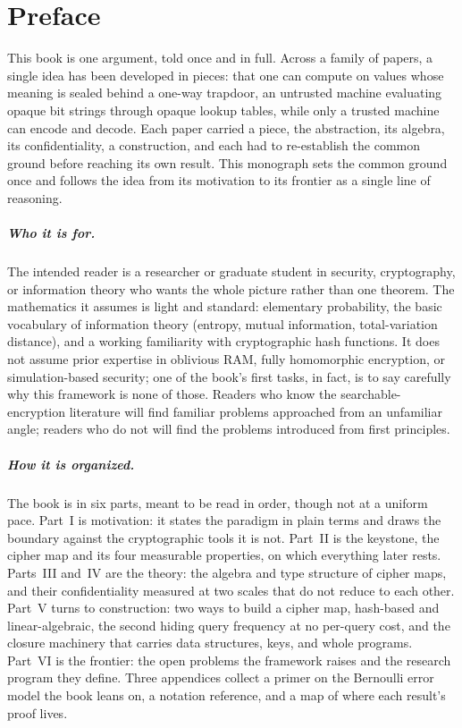 \chapter*{Preface}

This book is one argument, told once and in full. Across a family of papers,
a single idea has been developed in pieces: that one can compute on values
whose meaning is sealed behind a one-way trapdoor, an untrusted machine
evaluating opaque bit strings through opaque lookup tables, while only a
trusted machine can encode and decode. Each paper carried a piece, the
abstraction, its algebra, its confidentiality, a construction, and each had
to re-establish the common ground before reaching its own result. This
monograph sets the common ground once and follows the idea from its
motivation to its frontier as a single line of reasoning.

\paragraph{Who it is for.}
The intended reader is a researcher or graduate student in security,
cryptography, or information theory who wants the whole picture rather than
one theorem. The mathematics it assumes is light and standard: elementary
probability, the basic vocabulary of information theory (entropy, mutual
information, total-variation distance), and a working familiarity with
cryptographic hash functions. It does not assume prior expertise in oblivious
RAM, fully homomorphic encryption, or simulation-based security; one of the
book's first tasks, in fact, is to say carefully why this framework is none
of those. Readers who know the searchable-encryption literature will find
familiar problems approached from an unfamiliar angle; readers who do not
will find the problems introduced from first principles.

\paragraph{How it is organized.}
The book is in six parts, meant to be read in order, though not at a uniform
pace. Part~I is motivation: it states the paradigm in plain terms and draws
the boundary against the cryptographic tools it is not. Part~II is the
keystone, the cipher map and its four measurable properties, on which
everything later rests. Parts~III and~IV are the theory: the algebra and
type structure of cipher maps, and their confidentiality measured at two
scales that do not reduce to each other. Part~V turns to construction: two ways to
build a cipher map, hash-based and linear-algebraic, the second hiding query
frequency at no per-query cost, and the closure machinery that carries data
structures, keys, and whole programs. Part~VI is the frontier: the open problems the framework
raises and the research program they define. Three appendices collect a
primer on the Bernoulli error model the book leans on, a notation reference,
and a map of where each result's proof lives.


